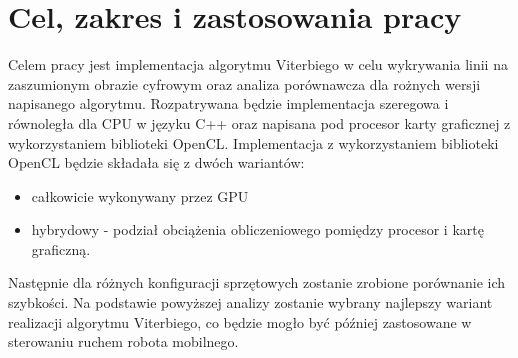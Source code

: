 \documentclass[document.tex]{subfiles}
\begin{document}
\section{Cel, zakres i zastosowania pracy}
\indent Celem pracy jest implementacja algorytmu Viterbiego w celu wykrywania linii na zaszumionym obrazie cyfrowym oraz analiza porównawcza dla rożnych wersji napisanego algorytmu.
Rozpatrywana będzie implementacja szeregowa i równoległa dla CPU w języku C++ oraz 
napisana pod procesor karty graficznej z wykorzystaniem biblioteki OpenCL. Implementacja
z wykorzystaniem biblioteki OpenCL będzie składała się z dwóch wariantów:
\begin{itemize}
	\item całkowicie wykonywany przez GPU
	\item hybrydowy - podział obciążenia obliczeniowego pomiędzy procesor i kartę graficzną.
\end{itemize} 
Następnie dla różnych konfiguracji sprzętowych zostanie zrobione porównanie ich szybkości.
Na podstawie powyższej analizy zostanie wybrany najlepszy wariant realizacji 
algorytmu Viterbiego, co będzie mogło być później zastosowane w sterowaniu ruchem robota
mobilnego.  
\end{document}

